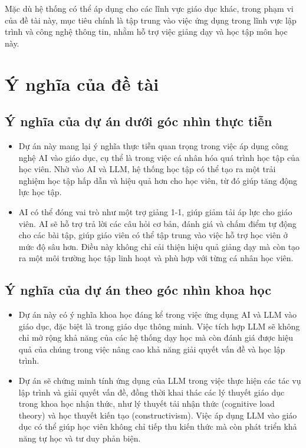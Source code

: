\par Mặc dù hệ thống có thể áp dụng cho các lĩnh vực giáo dục khác, trong phạm vi của đề tài này, mục tiêu chính là tập trung vào việc ứng dụng trong lĩnh vực lập trình và công nghệ thông tin, nhằm hỗ trợ việc giảng dạy và học tập môn học này.
\section{Ý nghĩa của đề tài}
\subsection{Ý nghĩa của dự án dưới góc nhìn thực tiễn}
\begin{itemize}
    \item Dự án này mang lại ý nghĩa thực tiễn quan trọng trong việc áp dụng công nghệ AI vào giáo dục, cụ thể là trong việc cá nhân hóa quá trình học tập của học viên. Nhờ vào AI và LLM, hệ thống học tập có thể tạo ra một trải nghiệm học tập hấp dẫn và hiệu quả hơn cho học viên, từ đó giúp tăng động lực học tập.
    \item AI có thể đóng vai trò như một trợ giảng 1-1, giúp giảm tải áp lực cho giáo viên. AI sẽ hỗ trợ trả lời các câu hỏi cơ bản, đánh giá và chấm điểm tự động cho các bài tập, giúp giáo viên có thể tập trung vào việc hỗ trợ học viên ở mức độ sâu hơn. Điều này không chỉ cải thiện hiệu quả giảng dạy mà còn tạo ra một môi trường học tập linh hoạt và phù hợp với từng cá nhân học viên.
\end{itemize}
\subsection{Ý nghĩa của dự án theo góc nhìn khoa học}
\begin{itemize}
    \item Dự án này có ý nghĩa khoa học đáng kể trong việc ứng dụng AI và LLM vào giáo dục, đặc biệt là trong giáo dục thông minh. Việc tích hợp LLM sẽ không chỉ mở rộng khả năng của các hệ thống dạy học mà còn đánh giá được hiệu quả của chúng trong việc nâng cao khả năng giải quyết vấn đề và học lập trình.
    \item Dự án sẽ chứng minh tính ứng dụng của LLM trong việc thực hiện các tác vụ lập trình và giải quyết vấn đề, đồng thời khai thác các lý thuyết giáo dục trong khoa học nhận thức, như lý thuyết tải nhận thức (cognitive load theory) và học thuyết kiến tạo (constructivism). Việc áp dụng LLM vào giáo dục có thể giúp học viên không chỉ tiếp thu kiến thức mà còn phát triển khả năng tự học và tư duy phản biện.
\end{itemize}

